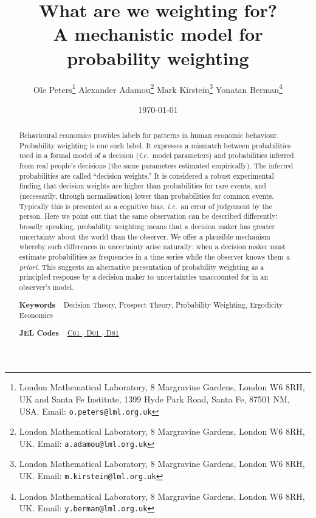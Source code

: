 \documentclass[a4paper, 12pt]{article}
\title{What are we weighting for? \\
{\large A mechanistic model for probability weighting}}
\author{
Ole Peters\footnote{London Mathematical Laboratory, 8 Margravine Gardens, London W6 8RH, UK and Santa Fe Institute, 1399 Hyde Park Road, Santa Fe, 87501 NM, USA. Email: \texttt{o.peters@lml.org.uk}} \;
Alexander Adamou\footnote{London Mathematical Laboratory, 8 Margravine Gardens, London W6 8RH, UK. Email: \texttt{a.adamou@lml.org.uk}} \;
Mark Kirstein\footnote{London Mathematical Laboratory, 8 Margravine Gardens, London W6 8RH, UK. Email: \texttt{m.kirstein@lml.org.uk}} \;
Yonatan Berman\footnote{London Mathematical Laboratory, 8 Margravine Gardens, London W6 8RH, UK. Email: \texttt{y.berman@lml.org.uk}} 
}
\date{\today}
\newcommand{\ie}{{\it i.e.}\ }
\begin{document}
\begin{titlepage}
	\maketitle
\thispagestyle{fancy}

\begin{abstract}
\noindent 
Behavioural economics provides labels for patterns in human economic behaviour. Probability weighting is one such label. It expresses a mismatch between probabilities used in a formal model of a decision (\ie model parameters) and probabilities inferred from real people's decisions (the same parameters estimated empirically). The inferred probabilities are called ``decision weights.'' It is considered a robust experimental finding that decision weights are higher than probabilities for rare events, and (necessarily, through normalisation) lower than probabilities for common events. Typically this is presented as a cognitive bias, \ie an error of judgement by the person. %
Here we point out that the same observation can be described differently: broadly speaking, probability weighting means that a decision maker has greater uncertainty about the world than the observer.
We offer a plausible mechanism whereby such differences in uncertainty arise naturally: when a decision maker must estimate probabilities as frequencies in a time series while the observer knows them {\it a priori}. This suggests an alternative presentation of probability weighting as a principled response by a decision maker to uncertainties unaccounted for in an observer's model.
\vspace{1em}

\noindent\textsf{\textbf{Keywords}} ~ Decision Theory, Prospect Theory, Probability Weighting, Ergodicity Economics
\vspace{.5em}

\noindent\textsf{\textbf{JEL Codes}} ~
\href{https://www.aeaweb.org/econlit/jelCodes.php?view=jel#C}{%
C61		%
$\cdot$
}%
\href{https://www.aeaweb.org/econlit/jelCodes.php?view=jel#D}{%
D01 	%
$\cdot$
D81 	%
}
\end{abstract}
\end{titlepage}
 
\end{document}
